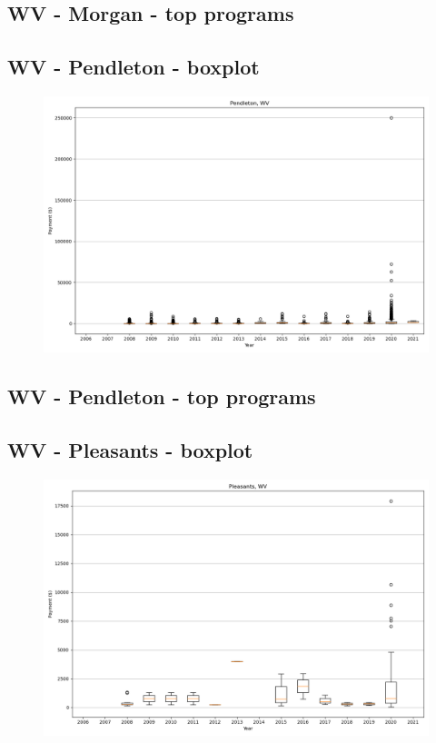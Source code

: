 \subsection*{WV - Morgan - top programs}

\newpage
\subsection*{WV - Pendleton - boxplot}
\begin{figure}[h]
\centering
\includegraphics[width=7in]{../output/boxplots/counties/Pendleton-WV_boxplot.png}
\end{figure}


\subsection*{WV - Pendleton - top programs}

\newpage
\subsection*{WV - Pleasants - boxplot}
\begin{figure}[h]
\centering
\includegraphics[width=7in]{../output/boxplots/counties/Pleasants-WV_boxplot.png}
\end{figure}


